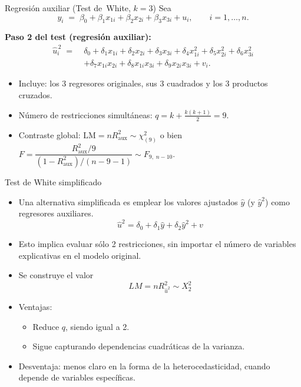\documentclass{beamer}
\begin{document}
\begin{frame}{Regresión auxiliar (Test de White, $k=3$)}
Sea
\[
y_i \;=\;\beta_0+\beta_1x_{1i}+\beta_2x_{2i}+\beta_3x_{3i}+u_i ,
\qquad i=1,\dots,n .
\]

\medskip
\textbf{Paso 2 del test (regresión auxiliar):}
\[
\begin{aligned}
\hat{u}_i^{\,2}\;=\;&
\delta_0
+\delta_1 x_{1i}+\delta_2 x_{2i}+\delta_3 x_{3i}
+\delta_4 x_{1i}^{2}+\delta_5 x_{2i}^{2}+\delta_6 x_{3i}^{2} \\
&+\delta_7 x_{1i}x_{2i}+\delta_8 x_{1i}x_{3i}+\delta_9 x_{2i}x_{3i}
+ v_i .
\end{aligned}
\]

\begin{itemize}
  \item Incluye: los 3 regresores originales, sus 3 cuadrados y los 3 productos cruzados.
  \item Número de restricciones simultáneas: \(q =k+ \tfrac{k(k+1)}{2} = 9\).
  \item Contraste global: \(\text{LM}=nR_{\text{aux}}^{2}\sim\chi^{2}_{(9)}\)
        o bien
        \(F=\dfrac{R_{\text{aux}}^{2}/9}{(1-R_{\text{aux}}^{2})/(n-9-1)}
          \sim F_{9,\;n-10}\).
\end{itemize}
\end{frame}




\begin{frame}{Test de White simplificado}
\begin{itemize}
    \item Una alternativa simplificada es emplear los valores ajustados $\hat{y}$ (y $\hat{y}^{2}$) como regresores auxiliares.
    $$\hat{u}^2=\delta_0 + \delta_1\hat{y}+\delta_2\hat{y}^2+v$$
\item Esto implica evaluar sólo 2 restricciones, sin importar el número de variables explicativas en el modelo original.
\item Se construye el valor 
$$LM = nR_{\hat{u}^2}^2\sim X_{2}^2$$
  \item Ventajas:
    \begin{itemize}
      \item Reduce $q$, siendo igual a 2.
      \item Sigue capturando dependencias cuadráticas de la varianza.
    \end{itemize}
  \item Desventaja: menos claro en la forma de la heterocedasticidad, cuando depende de variables específicas.
\end{itemize}
\end{frame}
\end{document}
